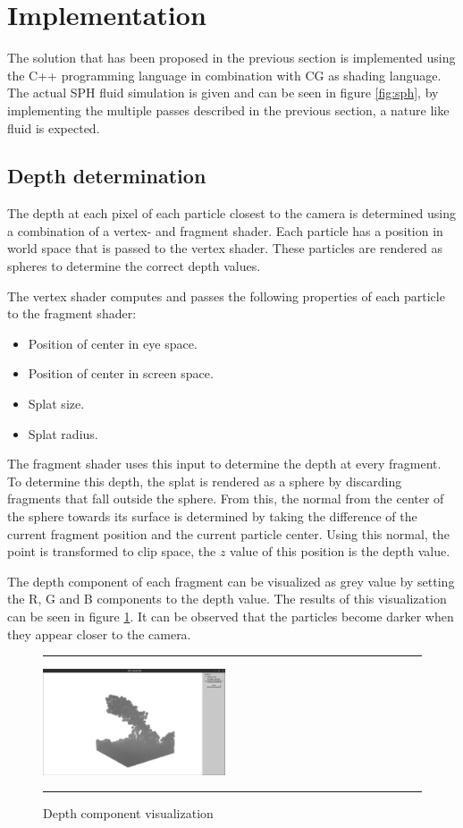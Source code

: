 \section{Implementation}
The solution that has been proposed in the previous section is implemented using the C++ programming language in combination with CG as shading language.
The actual SPH fluid simulation is given and can be seen in figure \ref{fig:sph}, by implementing the multiple passes described in the previous section, a nature like fluid is expected.

\subsection{Depth determination}
The depth at each pixel of each particle closest to the camera is determined using a combination of a vertex- and fragment shader.
Each particle has a position in world space that is passed to the vertex shader.
These particles are rendered as spheres to determine the correct depth values.

The vertex shader computes and passes the following properties of each particle to the fragment shader:
\begin{itemize}
 	\item Position of center in eye space.
 	\item Position of center in screen space.
 	\item Splat size.
 	\item Splat radius.
 \end{itemize} 

The fragment shader uses this input to determine the depth at every fragment.
To determine this depth, the splat is rendered as a sphere by discarding fragments that fall outside the sphere.
From this, the normal from the center of the sphere towards its surface is determined by taking the difference of the current fragment position and the current particle center.
Using this normal, the point is transformed to clip space, the $z$ value of this position is the depth value.

The depth component of each fragment can be visualized as grey value by setting the R, G and B components to the depth value.
The results of this visualization can be seen in figure \ref{fig:depth}.
It can be observed that the particles become darker when they appear  closer to the camera.

\begin{figure}[!th]
\hrule
\begin{center}
\vspace*{2ex}\includegraphics[width=0.48\textwidth]{pictures/depth.png}
\end{center}
\caption{Depth component visualization}
\label{fig:depth} 
\vspace*{2ex}
\hrule
\end{figure}